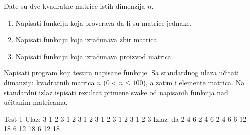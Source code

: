 \begin{Exercise}[label=315]
Date su dve kvadratne matrice istih dimenzija $n$. 
\begin{enumerate}
\item Napisati funkciju koja proverava da li su matrice jednake.
\item Napisati funkciju koja izračunava zbir matrica.
\item Napisati funkciju koja izračunava proizvod matrica.
\end{enumerate}
Napisati program koji testira napisane funkcije. Sa standardnog
ulaza učitati dimanziju kvadratnih matrica $n$
($0<n\leq 100$), a zatim i elemente matrica. Na standardni izlaz
ispisati rezultat primene svake od napisanih funkcija nad
učitanim matricama.

\begin{minitest}

\begin{test}{Test 1}
Ulaz:   3
        1 2 3
        1 2 3
        1 2 3
        1 2 3
        1 2 3
        1 2 3
Izlaz:  da
        2 4 6
        2 4 6
        2 4 6
        6 12 18
        6 12 18
        6 12 18
\end{test}
\end{minitest}
\end{Exercise}
\begin{Answer}[ref=315]
\end{Answer}


